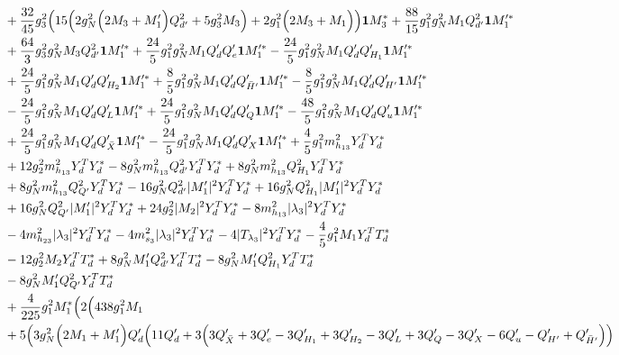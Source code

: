 {\begin{align}
 &+\frac{32}{45} g_{3}^{2} \Big(15 \Big(2 g_{N}^{2} \Big(2 M_3  + M_1'\Big)Q_{d'}^{2}  + 5 g_{3}^{2} M_3 \Big) + 2 g_{1}^{2} \Big(2 M_3  + M_1\Big)\Big){\bf 1} M_3^* +\frac{88}{15} g_{1}^{2} g_{N}^{2} M_1 Q_{d'}^{2} {\bf 1} M_1'^* \nonumber \\ 
 &+\frac{64}{3} g_{3}^{2} g_{N}^{2} M_3 Q_{d'}^{2} {\bf 1} M_1'^* +\frac{24}{5} g_{1}^{2} g_{N}^{2} M_1 Q_d' Q_e' {\bf 1} M_1'^* -\frac{24}{5} g_{1}^{2} g_{N}^{2} M_1 Q_d' Q_{H_1}' {\bf 1} M_1'^* \nonumber \\ 
 &+\frac{24}{5} g_{1}^{2} g_{N}^{2} M_1 Q_d' Q_{H_2}' {\bf 1} M_1'^* +\frac{8}{5} g_{1}^{2} g_{N}^{2} M_1 Q_d' Q_{\bar{H}'}' {\bf 1} M_1'^* -\frac{8}{5} g_{1}^{2} g_{N}^{2} M_1 Q_d' Q_{H'}' {\bf 1} M_1'^* \nonumber \\ 
 &-\frac{24}{5} g_{1}^{2} g_{N}^{2} M_1 Q_d' Q_L' {\bf 1} M_1'^* +\frac{24}{5} g_{1}^{2} g_{N}^{2} M_1 Q_d' Q_Q' {\bf 1} M_1'^* -\frac{48}{5} g_{1}^{2} g_{N}^{2} M_1 Q_d' Q_u' {\bf 1} M_1'^* \nonumber \\ 
 &+\frac{24}{5} g_{1}^{2} g_{N}^{2} M_1 Q_d' Q_{\bar{X}}' {\bf 1} M_1'^* -\frac{24}{5} g_{1}^{2} g_{N}^{2} M_1 Q_d' Q_X' {\bf 1} M_1'^* +\frac{4}{5} g_{1}^{2} m_{h_{13}}^2 {Y_{d}^{T}  Y_d^*} \nonumber \\ 
 &+12 g_{2}^{2} m_{h_{13}}^2 {Y_{d}^{T}  Y_d^*} -8 g_{N}^{2} m_{h_{13}}^2 Q_{d'}^{2} {Y_{d}^{T}  Y_d^*} +8 g_{N}^{2} m_{h_{13}}^2 Q_{H_1}^{2} {Y_{d}^{T}  Y_d^*} \nonumber \\ 
 &+8 g_{N}^{2} m_{h_{13}}^2 Q_{Q'}^{2} {Y_{d}^{T}  Y_d^*} -16 g_{N}^{2} Q_{d'}^{2} |M_1'|^2 {Y_{d}^{T}  Y_d^*} +16 g_{N}^{2} Q_{H_1}^{2} |M_1'|^2 {Y_{d}^{T}  Y_d^*} \nonumber \\ 
 &+16 g_{N}^{2} Q_{Q'}^{2} |M_1'|^2 {Y_{d}^{T}  Y_d^*} +24 g_{2}^{2} |M_2|^2 {Y_{d}^{T}  Y_d^*} -8 m_{h_{13}}^2 |\lambda_3|^2 {Y_{d}^{T}  Y_d^*} \nonumber \\ 
 &-4 m_{h_{23}}^2 |\lambda_3|^2 {Y_{d}^{T}  Y_d^*} -4 m_{s_3}^2 |\lambda_3|^2 {Y_{d}^{T}  Y_d^*} -4 |T_{\lambda_3}|^2 {Y_{d}^{T}  Y_d^*} -\frac{4}{5} g_{1}^{2} M_1 {Y_{d}^{T}  T_d^*} \nonumber \\ 
 &-12 g_{2}^{2} M_2 {Y_{d}^{T}  T_d^*} +8 g_{N}^{2} M_1' Q_{d'}^{2} {Y_{d}^{T}  T_d^*} -8 g_{N}^{2} M_1' Q_{H_1}^{2} {Y_{d}^{T}  T_d^*} \nonumber \\ 
 &-8 g_{N}^{2} M_1' Q_{Q'}^{2} {Y_{d}^{T}  T_d^*} \nonumber \\ 
 &+\frac{4}{225} g_{1}^{2} M_1^* \Big(2 \Big(438 g_{1}^{2} M_1 \nonumber \\ 
 &+5 \Big(3 g_{N}^{2} \Big(2 M_1  + M_1'\Big)Q_d' \Big(11 Q_d'  + 3 \Big(3 Q_{\bar{X}}'  + 3 Q_e'  -3 Q_{H_1}'  + 3 Q_{H_2}'  -3 Q_L'  + 3 Q_Q'  -3 Q_X'  -6 Q_u'  - Q_{H'}'  + Q_{\bar{H}'}'\Big)\Big)\nonumber\\

\end{align}}
